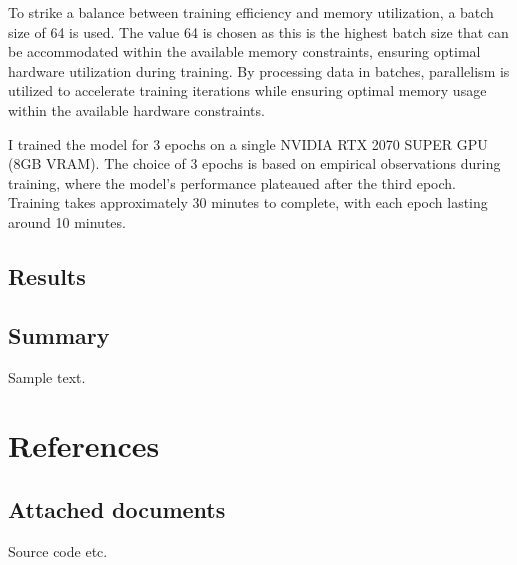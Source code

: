 \documentclass[a4paper,oneside]{article}
\begin{document}
To strike a balance between training efficiency and memory utilization, a batch size of 64 is used.
The value 64 is chosen as this is the highest batch size that can be accommodated within the available memory constraints, ensuring optimal hardware utilization during training.
By processing data in batches, parallelism is utilized to accelerate training iterations while ensuring optimal memory usage within the available hardware constraints.

I trained the model for 3 epochs on a single NVIDIA RTX 2070 SUPER GPU (8GB VRAM).
The choice of 3 epochs is based on empirical observations during training, where the model's performance plateaued after the third epoch.
Training takes approximately 30 minutes to complete, with each epoch lasting around 10 minutes.

\subsection{Results}
\label{sec:subsection_results}



\newpage
\subsection{Summary}
\label{sec:summary}

Sample text.

\newpage
\section{References}
\label{sec:references}



\subsection{Attached documents}
\label{sec:attached_documents}

Source code etc.
\end{document}
